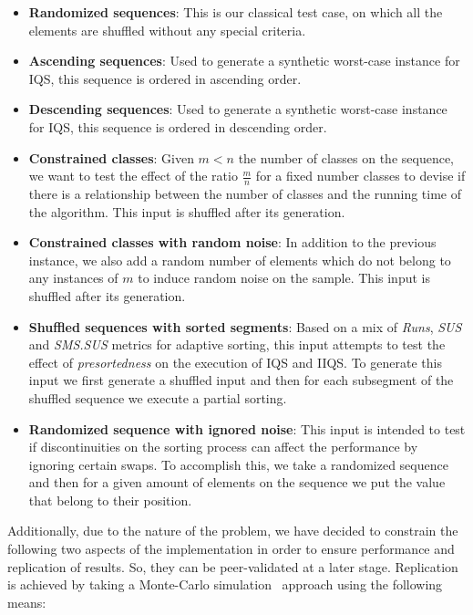 \begin{itemize}
        
    \item{\textbf{Randomized sequences}: 
    This is our classical test case, on which all the elements are shuffled without any special criteria.}

    \item{\textbf{Ascending sequences}: 
    Used to generate a synthetic worst-case instance for IQS, this sequence is ordered in ascending order.}

    \item{\textbf{Descending sequences}: 
    Used to generate a synthetic worst-case instance for IQS, this sequence is ordered in descending order.}

    \item{\textbf{Constrained classes}: 
    Given $m < n$ the number of classes on the sequence, we want to test the effect of the ratio $\frac{m}{n}$ for a fixed number classes to devise if there is a relationship between the number of classes and the running time of the algorithm. This input is shuffled after its generation.}

    \item{\textbf{Constrained classes with random noise}: 
    In addition to the previous instance, we also add a random number of elements which do not belong to any instances of $m$ to induce random noise on the sample. This input is shuffled after its generation.}

    \item{\textbf{Shuffled sequences with sorted segments}: 
    Based on a mix of \textit{Runs}, \textit{SUS} and \textit{SMS.SUS} metrics for adaptive sorting, this input attempts to test the effect of \textit{presortedness} on the execution of IQS and IIQS. To generate this input we first generate a shuffled input and then for each subsegment of the shuffled sequence we execute a partial sorting.}

    \item{\textbf{Randomized sequence with ignored noise}: 
    This input is intended to test if discontinuities on the sorting process can affect the performance by ignoring certain swaps. To accomplish this, we take a randomized sequence and then for a given amount of elements on the sequence we put the value that belong to their position.}
\end{itemize}

Additionally, due to the nature of the problem, we have decided to constrain the following two aspects of the implementation in order to ensure performance and replication of results. So, they can be peer-validated at a later stage. Replication is achieved by taking a Monte-Carlo simulation~\cite{10.5555/1614191} approach using the following means:\\

